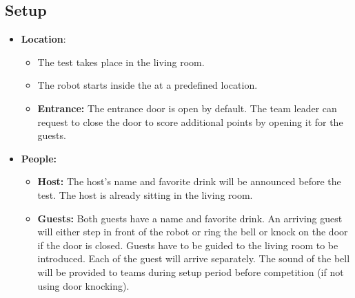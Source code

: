 \subsection*{Setup}
\begin{itemize}
	\item \textbf{Location}: 
	\begin{itemize}
	\item The test takes place in the living room.	
	\item The robot starts inside the \Arena{} at a predefined location.
	\item \textbf{Entrance:} The entrance door is open by default. The team leader can request to close the door to score additional points by opening it for the guests.
	\end{itemize}
	
	\item \textbf{People:} 
	\begin{itemize}
	\item \textbf{Host:} The host's name and favorite drink will be announced before the test. The host is already sitting in the living room.

	\item \textbf{Guests:} Both guests have a name and favorite drink. An arriving guest will either step in front of the robot or ring the bell or knock on the door if the door is closed. Guests have to be guided to the living room to be introduced. Each of the guest will arrive separately. The sound of the bell will be provided to teams
	during setup period before competition (if not using door knocking).
	\end{itemize}

\end{itemize}


